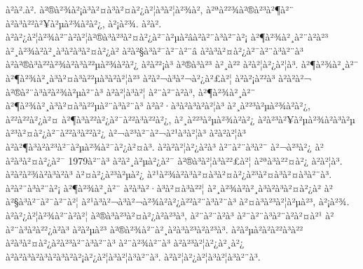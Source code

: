 à²à².à². à²®à²¾à²¡à³à²¤à³à²¤à²¿à²¦à³à²¦à²¾à², à²ªà²²¾à²®à²³à²¶à²¨ à²à³à²²à²¥à²µà²¾à²à²¿, à²¡à²¾. à²à². à²à²¿à²¦à²¾à²¨à²à²¦à²®à³à²³à²¤à²¿à²¯à²µà²\circ âà²à²¨à³à²¨à²¡ à²¶à²¾à²¸à²¨à²à²³ à²¸à²¾à²à²¸à³à²à³à²¤à²¿à² à²à²§à³à²¯à²¯à²¨â à²à³à²¤à²¿à²¯à²¨à³à²¨à³ à²à²®à³à²²à²¾à²à³à²²µà²¾à²à²¿ à²à²²¡à³ à²®à³à²³ à²¸à²² à²à²¦à²¿à²¦à³. à²¶à²¾à²¸à²¨ à²¶à²¾à²¸à³à²¤à³à²²µà³à²à²¦à²³ à²à²¬à³à²¬à²¿à²£à²¦ à²à²¡à²²à³ à²à²à²¬ à²®à²¨à³à²­à²¾à²µà²¨à³ à²à²¦à³à²¦ à²¨à²¨à²à³, à²¶à²¾à²¸à²¨ à²¶à²¾à²¸à³à²¤à³à²²µà²¨à³à²¨à³ à²à²·à³à²à³à²à²¦à³ à²¸à²²³à²µà²¾à²à²¿, à²²à²²à²¿à²¤ à²¶à³à²²à²¿à²¯à²²à³à²²à²¿, à²¸à²²³à²µà²¾à²à²¿ à²à²³à²¥à²µà²¾à²à³à²µ à²³à²¤à²¿à²¯à²²à³à²²à²¿ à²¬à²³à²¯à²¬à²¹à³à²¦à³ à²à²à²¦à³ à²à²¶à³à²à²³à²¯à²µà²¾à²¯à²¿à²¤à³. à²à²à²¦à²¿à²à³ à²¨à²¨à³à²¨ à²¬à²³à²¿ à² à²à³à²¤à²¿à²¯ 1979à²¨à³ à²à²¸à²µà²¿à²¯ à²®à³à²¦à³à²²£à²¦ à²ªà³à²²¤à²¿ à²à²¦à³. à²à²à²¾à²à³à²à³ à²¤à²¿à²³à²µà²¿ à²¹à²¾à²à³à²¤à³à²¤à²¿à²³à²¤à³à²¤à³à²¨à³. à²à²¨à³à²¨à²¡ à²¶à²¾à²¸à²¨ à²à³à²·à³à²¤à³à²²¦ à²¸à²¾à²à²¸à³à²à³à²¤à²¿à² à²à²§à³à²¯à²¯à²¨à²¦ à²¹à³à²¬à³à²¬à²¾à²à²¿à²²à²¨à³à²¨à³ à²¤à³à²³à²¦à²µà²³, à²¡à²¾. à²à²¿à²¦à²¾à²¨à²à²¦ à²®à³à²³à²¤à²¿à²à²³à³, à²¨à²¨à²à³ à²¨à²¨à³à²¨à²à²¤à²¹ à²à²¨à³à²à²²¿à²à³ à²à²µà²³ à²®à²¾à²¨à²¸à²à³à²³à²à²³à³. à²à²µà²\circ à²à²²à³à²² à²à³à²¤à²¿à²à²³à²¨à³à²¨à³ à²¨à²¾à²¨à³ à²à²³à²¦à²¿à²¸à²¿ à²à²à³à²à³à²à³à²à²¡à²¿à²¦à³à²¦à³à²¨à³. à²à²¦à²¿à²¦à³à²¦à³à²¨à³.

